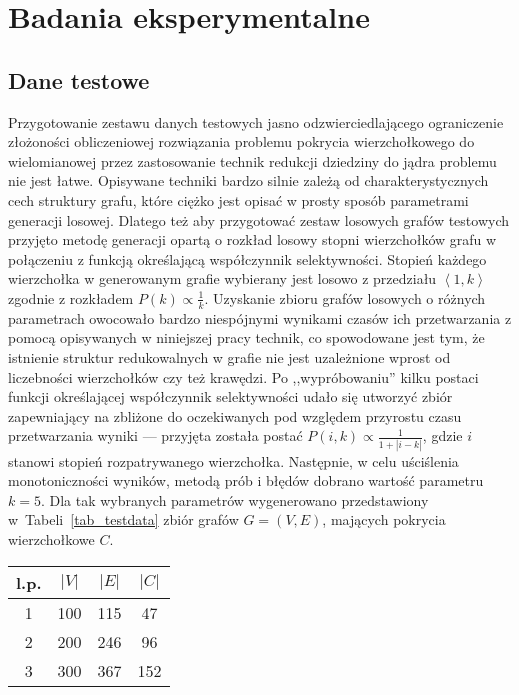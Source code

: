 \chapter{Badania eksperymentalne}
\label{results}
\section{Dane testowe}
\par{
  Przygotowanie zestawu danych testowych jasno odzwierciedlającego ograniczenie złożoności obliczeniowej rozwiązania problemu pokrycia wierzchołkowego do wielomianowej przez zastosowanie technik redukcji dziedziny do jądra problemu nie jest łatwe.
  Opisywane techniki bardzo silnie zależą od charakterystycznych cech struktury grafu, które ciężko jest opisać w prosty sposób parametrami generacji losowej.
  Dlatego też aby przygotować zestaw losowych grafów testowych przyjęto metodę generacji opartą o rozkład losowy stopni wierzchołków grafu w połączeniu z funkcją określającą współczynnik selektywności.
  Stopień każdego wierzchołka w generowanym grafie wybierany jest losowo z przedziału $\left<1, k\right>$ zgodnie z rozkładem $P(k) \propto \frac{1}{k}$.
  Uzyskanie zbioru grafów losowych o różnych parametrach owocowało bardzo niespójnymi wynikami czasów ich przetwarzania z pomocą opisywanych w niniejszej pracy technik, co spowodowane jest tym, że istnienie struktur redukowalnych w grafie nie jest uzależnione wprost od liczebności wierzchołków czy też krawędzi.
  Po ,,wypróbowaniu'' kilku postaci funkcji określającej współczynnik selektywności udało się utworzyć zbiór zapewniający na zbliżone do oczekiwanych pod względem przyrostu czasu przetwarzania wyniki --- przyjęta została postać $P(i, k) \propto \frac{1}{1+|i-k|}$, gdzie $i$ stanowi stopień rozpatrywanego wierzchołka.
  Następnie, w celu uściślenia monotoniczności wyników, metodą prób i błędów dobrano wartość parametru $k=5$.
  Dla tak wybranych parametrów wygenerowano przedstawiony w~Tabeli~\ref{tab_testdata} zbiór grafów $G=(V, E)$, mających pokrycia wierzchołkowe $C$.\\
  \begin{table}
    \begin{center}
    \begin{tabular}{| c | c | c | c |}
      \hline
      l.p. & $|V|$ & $|E|$ & $|C|$ \\ \hline
      1 & 100 & 115 & 47 \\
      2 & 200 & 246 & 96 \\
      3 & 300 & 367 & 152 \\

\end{tabular}
\end{center}
\end{table}}
